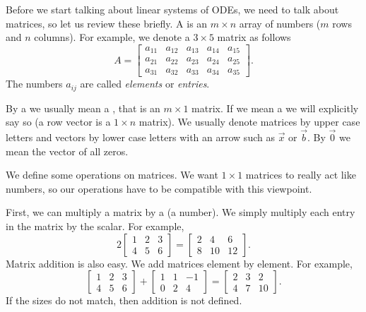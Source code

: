 Before we start talking about linear systems of ODEs, we need to
talk about matrices, so let us review these briefly.  A \emph{}
is an $m
\times n$ array of numbers ($m$ rows and $n$ columns).  For example, we denote
a $3 \times 5$ matrix as follows
\begin{equation*}
A = 
\begin{bmatrix}
a_{11} & a_{12} & a_{13} & a_{14} & a_{15} \\
a_{21} & a_{22} & a_{23} & a_{24} & a_{25} \\
a_{31} & a_{32} & a_{33} & a_{34} & a_{35}
\end{bmatrix} .
\end{equation*}
The numbers $a_{ij}$ are called \emph{elements}
or \emph{entries}.

By a \emph{} we usually mean a \emph{}, that is an $m \times 1$ matrix.  If we mean a \emph{} we will explicitly say so (a row vector is a $1 \times n$ matrix).
We usually denote
matrices by upper case letters and vectors by lower case letters with an
arrow such as $\vec{x}$ or $\vec{b}$.  By $\vec{0}$ we mean the vector
of all zeros.

We define some operations on matrices.  We 
want $1 \times 1$ matrices to really act like numbers, so our operations
have to be compatible with this viewpoint.

First, we can multiply a matrix by
a \emph{} (a number).
We simply multiply each entry in the matrix by the scalar.  For example,
\begin{equation*}
2
\begin{bmatrix}
1 & 2 & 3 \\
4 & 5 & 6
\end{bmatrix} =
\begin{bmatrix}
2 & 4 & 6 \\
8 & 10 & 12
\end{bmatrix} .
\end{equation*}
Matrix addition is also easy.
We add matrices element by element.
For example,
\begin{equation*}
\begin{bmatrix}
1 & 2 & 3 \\
4 & 5 & 6
\end{bmatrix} +
\begin{bmatrix}
1 & 1 & -1 \\
0 & 2 & 4
\end{bmatrix}
=
\begin{bmatrix}
2 & 3 & 2 \\
4 & 7 & 10
\end{bmatrix} .
\end{equation*}
If the sizes do not match, then addition is not defined.

